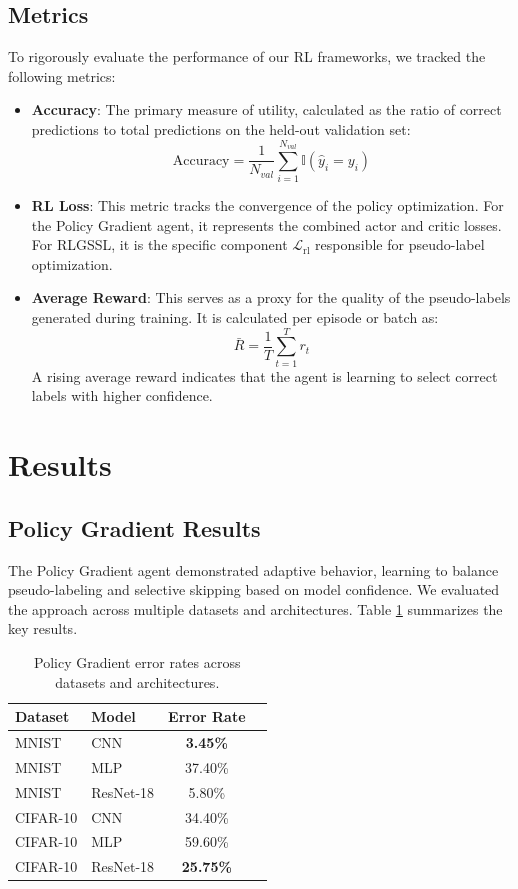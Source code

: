 \documentclass[pdflatex,sn-mathphys-num]{sn-jnl}%
\theoremstyle{thmstyleone}%
\theoremstyle{thmstyletwo}%
\theoremstyle{thmstylethree}%
\begin{document}
\subsection{Metrics}\label{subsec:metrics}
To rigorously evaluate the performance of our RL frameworks, we tracked the following metrics:

\begin{itemize}
    \item \textbf{Accuracy}: The primary measure of utility, calculated as the ratio of correct predictions to total predictions on the held-out validation set:
    \begin{equation}
        \text{Accuracy} = \frac{1}{N_{val}} \sum_{i=1}^{N_{val}} \mathbb{I}(\hat{y}_i = y_i)
    \end{equation}
    \item \textbf{RL Loss}: This metric tracks the convergence of the policy optimization. For the Policy Gradient agent, it represents the combined actor and critic losses. For RLGSSL, it is the specific component $\mathcal{L}_{\text{rl}}$ responsible for pseudo-label optimization.
    \item \textbf{Average Reward}: This serves as a proxy for the quality of the pseudo-labels generated during training. It is calculated per episode or batch as:
    \begin{equation}
        \bar{R} = \frac{1}{T} \sum_{t=1}^{T} r_t
    \end{equation}
    A rising average reward indicates that the agent is learning to select correct labels with higher confidence.
\end{itemize}

\section{Results}\label{sec:results}

\subsection{Policy Gradient Results}
The Policy Gradient agent demonstrated adaptive behavior, learning to balance pseudo-labeling and selective skipping based on model confidence. We evaluated the approach across multiple datasets and architectures. Table \ref{tab:pg_results} summarizes the key results.

\begin{table}[h]
\caption{Policy Gradient error rates across datasets and architectures.}\label{tab:pg_results}
\begin{tabular}{@{}llcc@{}}
\toprule
Dataset & Model & Error Rate \\
\midrule
MNIST & CNN & \textbf{3.45\%} \\
MNIST & MLP & 37.40\% \\
MNIST & ResNet-18 & 5.80\% \\
CIFAR-10 & CNN & 34.40\% \\
CIFAR-10 & MLP & 59.60\% \\
CIFAR-10 & ResNet-18 & \textbf{25.75\%} \\
\bottomrule
\end{tabular}
\end{table}
\end{document}
